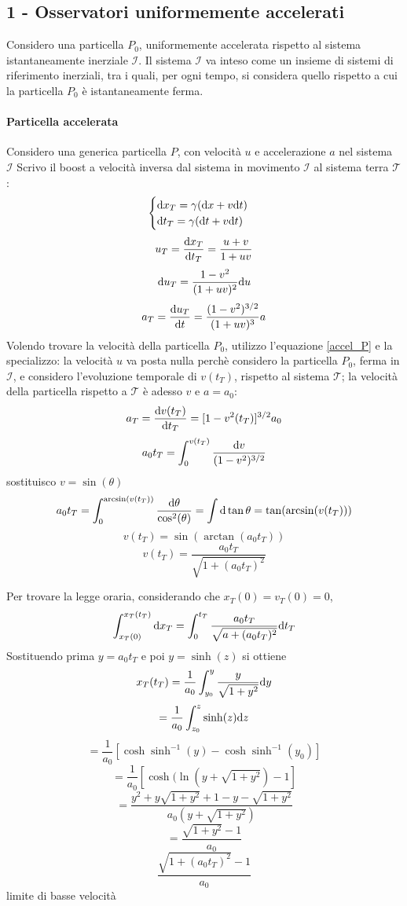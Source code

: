 \subsection{1 - Osservatori uniformemente accelerati}
Considero una particella $P_0$, uniformemente accelerata rispetto al sistema istantaneamente inerziale  $\mathcal{I}$.
Il sistema $\mathcal{I}$ va inteso come un insieme di sistemi di riferimento inerziali, tra i quali, per ogni tempo, si considera quello rispetto a cui la particella $P_0$ \`e istantaneamente ferma.
\paragraph{Particella accelerata}
Considero una generica particella $P$, con velocit\`a $u$ e accelerazione $a$ nel sistema $\mathcal{I}$
Scrivo il boost a velocit\`a inversa dal sistema in movimento $\mathcal{I}$ al sistema terra $\mathcal{T}$:
\begin{equation}
	\begin{cases}
		\mathrm{d} x_T = \gamma (\mathrm{d} x + v \mathrm{d} t) &  \\
		\mathrm{d} t_T = \gamma (\mathrm{d} t + v \mathrm{d} t) &  \\ 
	\end{cases}
\end{equation}
\[  u_T = \frac{\mathrm{d} x_T}{\mathrm{d} t_T} = \frac{u+v}{1+uv} \]
\[ \mathrm{d} u_T = \frac{1-v^2}{(1+uv)^2} \mathrm{d} u \]
\begin{equation} \label{accel_P}
	a_T = \frac{\mathrm{d} u_T}{\mathrm{d} t} = \frac{(1-v^2)^{3/2}}{(1+uv)^3} a 
\end{equation}
Volendo trovare la velocit\`a della particella $P_0$, utilizzo l'equazione \ref{accel_P} e la specializzo: la velocit\`a $u$ va posta nulla perch\`e considero la particella $P_0$, ferma in $\mathcal{I}$, e considero l'evoluzione temporale di $v(t_T)$, rispetto al sistema $\mathcal{T}$; la velocit\`a della particella rispetto a $\mathcal{T}$ \`e adesso $v$ e \( a = a_0 \):
\[ a_T = \frac{\mathrm{d} v(t_T)}{\mathrm{d} t_T} = [1-v^2(t_T)]^{3/2} a_0 \]
\[ a_0t_T = \int_0^{v(t_T)} \frac{\mathrm{d} v}{(1-v^2)^{3/2}} \]
sostituisco $v=\sin(\theta)$
\[ a_0t_T= \int_0^{\arcsin(v(t_T))} \frac{\mathrm{d} \theta}{\cos^2(\theta)} = \int \mathrm{d}\tan\theta = \tan(\arcsin(v(t_T))) \]
\[ v(t_T) = \sin(\arctan(a_0t_T)) \]
\[ v(t_T) = \frac{a_0 t_T}{\sqrt{1+(a_0t_T)^2}} \]

Per trovare la legge oraria, considerando che \(x_T(0)=v_T(0)=0\),
\[ \int_{x_T(0)}^{x_T(t_T)} \mathrm{d} x_T = \int_0^{t_T} \frac{a_0t_T}{\sqrt{a+(a_0t_T)^2}} \mathrm{d} t_T \]
Sostituendo prima \( y=a_0t_T \) e poi \( y = \sinh(z) \) si ottiene
\[ x_T(t_T) = \frac{1}{a_0} \int_{y_0}^y \frac{y}{\sqrt{1+y^2}} \mathrm{d} y \]
\[ = \frac{1}{a_0} \int_{z_0}^z \sinh(z) \mathrm{d} z \]	
\[ = \frac{1}{a_0} [\cosh\sinh^{-1}(y) - \cosh\sinh^{-1}(y_0)] \]
\[ = \frac{1}{a_0} [\cosh(\ln(y + \sqrt{1+y^2}) -1] \]
\[ = \frac{y^2+y\sqrt{1+y^2}+1-y-\sqrt{1+y^2}}{a_0(y+\sqrt{1+y^2})} \]
\[ = \frac{\sqrt{1+y^2}-1}{a_0} \]
\begin{equation} \label{leggeoraria}
	\frac{\sqrt{1+(a_0t_T)^2}-1}{a_0} 
\end{equation}
\todo limite di basse velocit\`a

